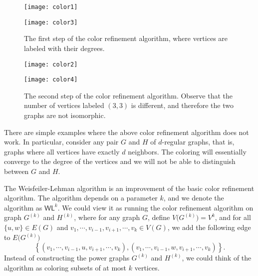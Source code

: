\documentclass[a4paper,twoside,justified]{tufte-handout}
\begin{document}
\begin{figure}[t]
  \begin{multicols}{2}
    \begin{center}
      \texttt{[image: color1]}
    \end{center}
    \columnbreak
    \begin{center}
      \texttt{[image: color3]}
    \end{center}
  \end{multicols}
  \caption{The first step of the color refinement algorithm, where vertices are labeled with their degrees.}
  \label{fig:colorrefinementstep1}
\end{figure}

\begin{figure}[t]
  \begin{multicols}{2}
    \begin{center}
      \texttt{[image: color2]}
    \end{center}
    \columnbreak
    \begin{center}
      \texttt{[image: color4]}
    \end{center}
  \end{multicols}
  \caption{The second step of the color refinement algorithm. Observe that the number of vertices labeled $(3,3)$
  is different, and therefore the two graphs are not isomorphic.}
  \label{fig:colorrefinementstep2}
\end{figure}

There are simple examples where the above color refinement algorithm does not work. In particular, 
consider any pair $G$ and $H$ of $d$-regular graphs, that is, graphs where all vertices have exactly $d$ neighbors.
The coloring will essentially converge to the degree of the vertices and we will not be able to distinguish between $G$ and $H$.

The Weisfeiler-Lehman algorithm is an improvement of the basic color refinement algorithm.
The algorithm depends on a parameter $k$, and we denote the algorithm as $\textsf{WL}^k$.
We could view it as running the color refinement algorithm on graph $G^{(k)}$ and $H^{(k)}$, where
for any graph $G$, define $V\bigl(G^{(k)}\bigr)=V^k$, and for all $\{u,w\} \in E(G)$ and $v_1,\cdots,v_{i-1},v_{i+1},\cdots,v_k \in V(G)$, 
we add the following edge to $E\bigl(G^{(k)}\bigr)$
\[
\left\{(v_1,\cdots,v_{i-1},u,v_{i+1},\cdots,v_k),(v_1,\cdots,v_{i-1},w,v_{i+1},\cdots,v_k)\right\}.
\]
Instead of constructing the power graphs $G^{(k)}$ and $H^{(k)}$, we could think of the algorithm as
coloring subsets of at most $k$ vertices. 
\end{document}
